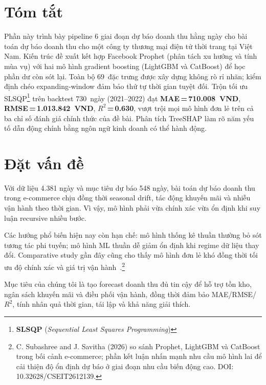 \documentclass[10pt,twocolumn]{article}
\begin{document}
\thispagestyle{empty}

\section*{\small Tóm tắt}
\vspace{-2pt}
{\small
Phần này trình bày pipeline 6 giai đoạn dự báo doanh thu hằng ngày cho
bài toán dự báo doanh thu cho một công ty thương mại điện tử thời trang tại Việt Nam. Kiến trúc đề xuất
kết hợp Facebook Prophet (phân tách xu hướng và tính mùa vụ) với hai
mô hình gradient boosting (LightGBM và CatBoost) để học phần dư còn
sót lại. Toàn bộ 69~đặc trưng được xây dựng không rò rỉ nhãn; kiểm
định chéo expanding-window đảm bảo thứ tự thời gian tuyệt đối. Trộn
tối ưu SLSQP\footnote{\textbf{SLSQP} (\textit{Sequential Least Squares Programming})} trên backtest 730~ngày (2021--2022) đạt
\textbf{MAE\,=\,710.008~VND}, \textbf{RMSE\,=\,1.013.842~VND},
\textbf{$R^2$\,=\,0.630}, vượt trội mọi mô hình đơn lẻ trên cả ba
chỉ số đánh giá chính thức của đề bài. Phân tích TreeSHAP làm rõ năm
yếu tố dẫn động chính bằng ngôn ngữ kinh doanh có thể hành động.
}

\section{Đặt vấn đề}

Với dữ liệu 4.381 ngày và mục tiêu dự báo 548 ngày, bài toán dự báo
doanh thu trong e-commerce chịu đồng thời seasonal drift, tác động
khuyến mãi và nhiễu vận hành theo thời gian. Vì vậy, mô hình phải vừa
chính xác vừa ổn định khi suy luận recursive nhiều bước.

Các hướng phổ biến hiện nay còn hạn chế: mô hình thống kê thuần
thường bỏ sót tương tác phi tuyến; mô hình ML thuần dễ giảm ổn định khi
regime dữ liệu thay đổi. Comparative study gần đây cũng cho thấy mô hình
đơn lẻ khó đồng thời tối ưu độ chính xác và giá trị vận
hành~\cite{subashree2026,m4,retail2022}.\footnote{C. Subashree and J. Savitha (2026) so sánh Prophet, LightGBM và CatBoost trong bối cảnh e-commerce; phần kết luận nhấn mạnh nhu cầu mô hình lai để cải thiện độ ổn định dự báo ở giai đoạn nhu cầu biến động cao. DOI: 10.32628/CSEIT2612139.}

Mục tiêu của chúng tôi là tạo forecast doanh thu đủ tin cậy để hỗ trợ
tồn kho, ngân sách khuyến mãi và điều phối vận hành, đồng thời đảm bảo
MAE/RMSE/$R^2$, tính nhân quả thời gian, tái lập và khả năng giải thích.
\end{document}
